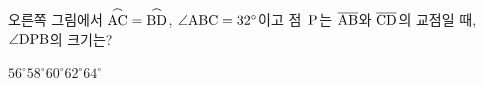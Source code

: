 \noindent\begin{minipage}[t]{0.58\linewidth}\vspace{0pt}\raggedright 오른쪽 그림에서 $\overset{\frown}{\mathrm{AC}}=\overset{\frown}{\mathrm{BD}}$, $\angle\mathrm{ABC}=32^\circ$이고 점~$\mathrm{P}$는 $\overline{\mathrm{AB}}$와 $\overline{\mathrm{CD}}$의 교점일 때, $\angle\mathrm{DPB}$의 크기는?\end{minipage}\hfill\begin{minipage}[t]{0.4\linewidth}\vspace{0pt}\centering \resizebox{\ifdim\width>\linewidth\linewidth\else\width\fi}{!}{}\end{minipage}\par
\begin{choicesii}{$56^\circ$}{$58^\circ$}{$60^\circ$}{$62^\circ$}{$64^\circ$}\end{choicesii}
